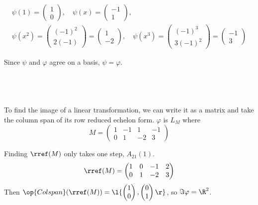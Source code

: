 \documentclass[a4paper]{article}
\begin{document}
\begin{gather*}
\psi(1) = \begin{pmatrix}1\\ 0\end{pmatrix},\quad
\psi(x) = \begin{pmatrix}-1\\ 1\end{pmatrix},\quad\\[1ex]
\psi(x^2) = \begin{pmatrix}(-1)^2\\ 2(-1)\end{pmatrix} = \begin{pmatrix}1\\ -2\end{pmatrix},\quad
\psi(x^3) = \begin{pmatrix}(-1)^3\\ 3(-1)^2\end{pmatrix} = \begin{pmatrix}-1\\ 3\end{pmatrix}
\end{gather*}

Since $\psi$ and $\varphi$ agree on a basis, $\psi = \varphi$.

\subsection{~}

To find the image of a linear transformation, we can write it as a matrix and take the column span of its row reduced echelon form. $\varphi$ is $L_M$ where $$M = \begin{pmatrix} 1 & -1 & 1 & -1\\ 0 & 1 & -2 & 3 \end{pmatrix}$$

Finding $\rref(M)$ only takes one step, $A_{21}(1)$. $$\rref(M) = \begin{pmatrix} 1 & 0 & -1 & 2\\ 0 & 1 & -2 & 3 \end{pmatrix}$$
Then $\op{Colspan}(\rref(M)) = \l\{ \begin{pmatrix}1\\ 0\end{pmatrix}, \begin{pmatrix}0\\ 1\end{pmatrix} \r\}$, so $\Im \varphi = \R^2$.

\subsection{~}
\end{document}
